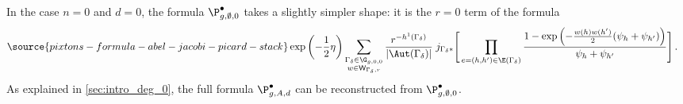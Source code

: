 In the case $n=0$ and $d=0$, the formula $\P_{g,\emptyset,0}^{\bullet}$ takes a slightly simpler shape: it is the $r=0$ term of the formula
\begin{align} \label{eqn:P_gformula2}
\source{pixtons-formula-abel-jacobi-picard-stack}
\exp\left(-\frac12 \eta \right) \sum_{
\substack{\Gamma_\delta\in \G_{g,0,0} \\
w\in \mathsf{W}_{\Gamma_\delta,r}}
}
\frac{r^{-h^1(\Gamma_\delta)}}{|\Aut(\Gamma_\delta)| }
\;
j_{\Gamma_\delta*}\Bigg[&
\prod_{e=(h,h')\in \E(\Gamma_\delta)}
\frac{1-\exp\left(-\frac{w(h)w(h')}2(\psi_h+\psi_{h'})\right)}{\psi_h + \psi_{h'}} \Bigg]\, . %
\end{align}
As explained in \cref{sec:intro_deg_0}, the full formula $\P_{g,A,d}^{\bullet}$ can be reconstructed from $\P_{g,\emptyset,0}^\bullet$.

